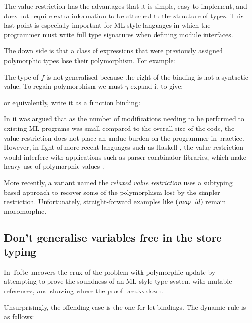 The value restriction has the advantages that it is simple, easy to implement, and does not require extra information to be attached to the structure of types. This last point is especially important for ML-style languages in which the programmer must write full type signatures when defining module interfaces.

The down side is that a class of expressions that were previously assigned polymorphic types lose their polymorphism. For example:


The type of $f$ is not generalised because the right of the binding is not a syntactic value. To regain polymorphism we must $\eta$-expand it to give:


or equivalently, write it as a function binding:


In \cite{wright:polymorphism-imperative} it was argued that as the number of modifications needing to be performed to existing ML programs was small compared to the overall size of the code, the value restriction does not place an undue burden on the programmer in practice. However, in light of more recent languages such as Haskell \cite{haskell98-report}, the value restriction would interfere with applications such as parser combinator libraries, which make heavy use of polymorphic values \cite{leigen:parsec}.

More recently, a variant named the \emph{relaxed value restriction} \cite{garrigue:relaxing} uses a subtyping based approach to recover some of the polymorphism lost by the simpler restriction. Unfortunately,  straight-forward examples like $(\operatorname{\mathit{map}} \ \operatorname{\mathit{id}})$ remain monomorphic.


\subsection{Don't generalise variables free in the store typing}
\label{System:PolyUpdate:dontgeneralise}
In \cite{tofte:polymorphic-references} Tofte uncovers the crux of the problem with polymorphic update by attempting to prove the soundness of an ML-style type system with mutable references, and showing where the proof breaks down.

Unsurprisingly, the offending case is the one for let-bindings. The dynamic rule is as follows:

